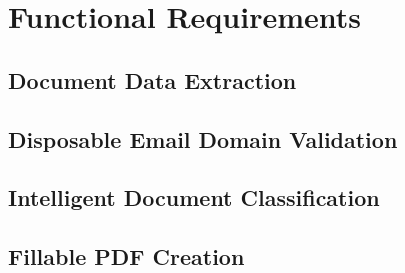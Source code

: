 \section{Functional Requirements}

\subsection{Document Data Extraction}



\subsection{Disposable Email Domain Validation}



\subsection{Intelligent Document Classification}



\subsection{Fillable PDF Creation}


